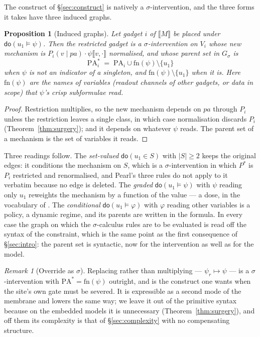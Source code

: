 \documentclass[11pt,a4paper]{article}
\theoremstyle{plain}
\newtheorem{proposition}[theorem]{Proposition}
\theoremstyle{definition}
\theoremstyle{remark}
\newtheorem{remark}[theorem]{Remark}
\newcommand{\sem}[1]{\llbracket #1 \rrbracket}
\newcommand{\dok}{\textsf{do}}
\newcommand{\PA}{\mathrm{PA}}
\begin{document}
The construct of \S\ref{sec:construct} is natively a $\sigma$-intervention, and
the three forms it takes have three induced graphs.

\begin{proposition}[Induced graphs]\label{prop:sigmagraph}
Let gadget $i$ of $\sem{M}$ be placed under $\dok(u_1 \models \psi)$. Then the
restricted gadget is a $\sigma$-intervention on $V_i$ whose new mechanism is
$P_i(v \mid \mathit{pa}) \cdot \psi\sem{v, \cdot}$ normalised, and whose parent
set in $G_\sigma$ is
\[
  \PA^*_i \;=\; \PA_i \cup \mathrm{fn}(\psi)\setminus\{u_1\}
\]
when $\psi$ is not an indicator of a singleton, and $\mathrm{fn}(\psi)\setminus\{u_1\}$
when it is. Here $\mathrm{fn}(\psi)$ are the names of variables (readout
channels of other gadgets, or data in scope) that $\psi$'s crisp subformulae
read.
\end{proposition}

\begin{proof}
Restriction multiplies, so the new mechanism depends on $\mathit{pa}$ through
$P_i$ unless the restriction leaves a single class, in which case normalisation
discards $P_i$ (Theorem~\ref{thm:surgery}); and it depends on whatever $\psi$
reads. The parent set of a mechanism is the set of variables it reads.
\end{proof}

Three readings follow. The \emph{set-valued} $\dok(u_1 \in S)$ with $|S| \geq 2$
keeps the original edges: it conditions the mechanism on $S$, which is a
$\sigma$-intervention in which $P^*$ is $P_i$ restricted and renormalised, and
Pearl's three rules do not apply to it verbatim because no edge is deleted. The
\emph{graded} $\dok(u_1 \models \psi)$ with $\psi$ reading only $u_1$ reweights
the mechanism by a function of the value --- a dose, in the vocabulary of
\cite{ExpRegimes}. The \emph{conditional} $\dok(u_1 \models \varphi)$ with
$\varphi$ reading other variables is a policy, a dynamic regime, and its parents
are written in the formula. In every case the graph on which the
$\sigma$-calculus rules are to be evaluated is read off the syntax of the
constraint, which is the same point as the first consequence of
\S\ref{sec:intro}: the parent set is syntactic, now for the intervention as
well as for the model.

\begin{remark}[Override as $\sigma$]
Replacing rather than multiplying --- $\psi_r \mapsto \psi$ --- is a
$\sigma$-intervention with $\PA^* = \mathrm{fn}(\psi)$ outright, and is the
construct one wants when the site's own gate must be severed. It is expressible
as a second mode of the membrane and lowers the same way; we leave it out of
the primitive syntax because on the embedded models it is unnecessary
(Theorem~\ref{thm:surgery}), and off them its complexity is that of
\S\ref{sec:complexity} with no compensating structure.
\end{remark}
\end{document}
